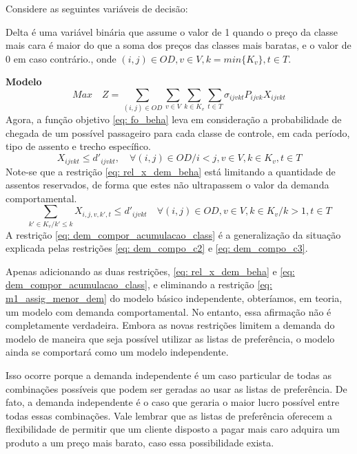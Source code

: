 Considere as seguintes variáveis de decisão:
\begin{description}[style=unboxed, leftmargin=2.5cm, labelindent=1.5cm]
	\setlength{\itemsep}{-2.2em} %
	\setlength{\parskip}{0em} %
	    \item[$\delta_{ijvkt}:$] Delta é uma variável binária que assume o valor de 1 quando o preço da classe mais cara é maior do que a soma dos preços das classes mais baratas, e o valor de 0 em caso contrário., onde $(i,j) \in OD, v \in V, k=min\{K_v\}, t \in T$.
\end{description}


\textbf{Modelo}
\begin{equation}
	Max \quad Z = \sum_{(i,j)\in OD} \sum_{v\in V} \sum_{k\in K_v} \sum_{t\in T} \sigma_{ijvkt} P_{ijvk} X_{ijvkt}           \label{eq: fo_beha}
\end{equation}
Agora, a função objetivo \eqref{eq: fo_beha} leva em consideração a probabilidade de chegada de um possível passageiro para cada classe de controle, em cada período, tipo de assento e trecho específico.
\begin{equation}
	X_{ijvkt} \leq d'_{ijvkt},  \quad \forall (i,j) \in OD / i < j  ,v \in V, k \in K_v, t\in T  \label{eq: rel_x_dem_beha}
\end{equation}
Note-se que a restrição \eqref{eq: rel_x_dem_beha} está limitando a quantidade de assentos reservados, de forma que estes não ultrapassem o valor da demanda comportamental.
\begin{equation}
	\sum_{k' \in K_v / k' \leq k}X_{i,j,v,k',t} \leq d'_{ijvkt} \quad \forall (i,j) \in OD, v \in V, k \in K_v / k > 1, t\in T     \label{eq: dem_compor_acumulacao_class}
\end{equation}
A restrição \eqref{eq: dem_compor_acumulacao_class} é a generalização da situação explicada pelas restrições \eqref{eq: dem_compo_c2}  e \eqref{eq: dem_compo_c3}.

Apenas adicionando as duas restrições, \eqref{eq: rel_x_dem_beha} e \eqref{eq: dem_compor_acumulacao_class}, e eliminando a restrição \eqref{eq: m1_assig_menor_dem} do modelo básico independente, obteríamos, em teoria, um modelo com demanda comportamental. No entanto, essa afirmação não é completamente verdadeira. Embora as novas restrições limitem a demanda do modelo de maneira que seja possível utilizar as listas de preferência, o modelo ainda se comportará como um modelo independente.

Isso ocorre porque a demanda independente é um caso particular de todas as combinações possíveis que podem ser geradas ao usar as listas de preferência. De fato, a demanda independente é o caso que geraria o maior lucro possível entre todas essas combinações. Vale lembrar que as listas de preferência oferecem a flexibilidade de permitir que um cliente disposto a pagar mais caro adquira um produto a um preço mais barato, caso essa possibilidade exista.

